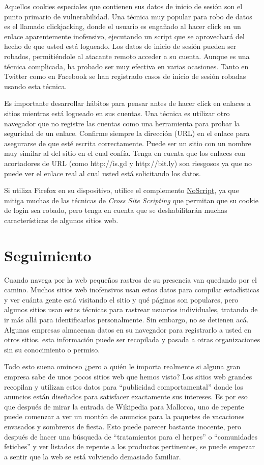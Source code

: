 \documentclass[10pt,a5paper,twoside,,]{book}
\begin{document}
Aquellos cookies especiales que contienen sus datos de inicio de sesión
son el punto primario de vulnerabilidad. Una técnica muy popular para
robo de datos es el llamado clickjacking, donde el usuario es engañado
al hacer click en un enlace aparentemente inofensivo, ejecutando un
script que se aprovechará del hecho de que usted está logueado. Los
datos de inicio de sesión pueden ser robados, permitiéndole al atacante
remoto acceder a su cuenta. Aunque es una técnica complicada, ha probado
ser muy efectiva en varias ocasiones. Tanto en Twitter como en Facebook
se han registrado casos de inicio de sesión robadas usando esta técnica.

Es importante desarrollar hábitos para pensar antes de hacer click en
enlaces a sitios mientras está logueado en sus cuentas. Una técnica es
utilizar otro navegador que no registre las cuentas como una herramienta
para probar la seguridad de un enlace. Confirme siempre la dirección
(URL) en el enlace para asegurarse de que esté escrita correctamente.
Puede ser un sitio con un nombre muy similar al del sitio en el cual
confía. Tenga en cuenta que los enlaces con acortadores de URL (como
http://is.gd y http://bit.ly) son riesgosos ya que no puede ver el
enlace real al cual usted está solicitando los datos.

Si utiliza Firefox en su dispositivo, utilice el complemento
\href{http://noscript.net}{NoScript}, ya que mitiga muchas de las
técnicas de \emph{Cross Site Scripting} que permitan que su cookie de
login sea robado, pero tenga en cuenta que se deshabilitarán muchas
características de algunos sitios web.

\chapter{Seguimiento}\label{seguimiento}

Cuando navega por la web pequeños rastros de su presencia van quedando
por el camino. Muchos sitios web inofensivos usan estos datos para
compilar estadísticas y ver cuánta gente está visitando el sitio y qué
páginas son populares, pero algunos sitios usan estas técnicas para
rastrear usuarios individuales, tratando de ir más allá para
identificarlos personalmente. Sin embargo, no se detienen acá. Algunas
empresas almacenan datos en su navegador para registrarlo a usted en
otros sitios. esta información puede ser recopilada y pasada a otras
organizaciones sin su conocimiento o permiso.

Todo esto suena ominoso ¿pero a quién le importa realmente si alguna
gran empresa sabe de unos pocos sitios web que hemos visto? Los sitios
web grandes recopilan y utilizan estos datos para ``publicidad
comportamental'' donde los anuncios están diseñados para satisfacer
exactamente sus intereses. Es por eso que después de mirar la entrada de
Wikipedia para Mallorca, uno de repente puede comenzar a ver un montón
de anuncios para la paquetes de vacaciones envasados y sombreros de
fiesta. Esto puede parecer bastante inocente, pero después de hacer una
búsqueda de ``tratamientos para el herpes'' o ``comunidades fetiches'' y
ver listados de repente a los productos pertinentes, se puede empezar a
sentir que la web se está volviendo demasiado familiar.
\end{document}
